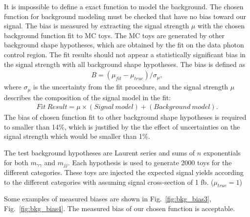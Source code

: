 It is impossible to define a exact function to model the background.
The chosen function for background modeling must be checked that have no bias toward our signal.
The bias is measured by extracting the signal strength $\mu$ with the chosen background function fit to MC toys.
The MC toys are generated by other background shape hypotheses, which are obtained by the fit on the data photon control region.
The fit results should not appear a statistically significant bias in the signal strength with all background shape hypotheses.
The bias is defined as
\begin{equation} \label{eq:CorBias}
  \begin{aligned}
	B = (\mu_{fit} - \mu_{true})/\sigma_{\mu},
  \end{aligned}
\end{equation}
where $\sigma_{\mu}$ is the uncertainty from the fit procedure, 
and the signal strength $\mu$ describes the composition of the signal model in the fit:
\begin{equation} \label{eq:SigStrength}
  \begin{aligned}
	Fit~Result = \mu \times (Signal~model) + (Background~model).
  \end{aligned}
\end{equation}
The bias of chosen function fit to other background shape hypotheses is required to smaller than 14\%, which is justified by the the effect of uncertainties on the signal strength which would be smaller than 1\%. %

The test background hypotheses are Laurent series and sums of $n$ exponentials for both $m_{\gamma\gamma}$ and $m_{jj}$. Each hypothesis is used to generate 2000 toys for the different categories.
These toys are injected the expected signal yields according to the different categories with assuming signal cross-section of 1 fb. ($\mu_{true}=1$)

Some examples of measured biases are shown in Fig.~\ref{fig:bkg_bias3}, Fig.~\ref{fig:bkg_bias4}.
The measured bias of our chosen function is acceptable.

